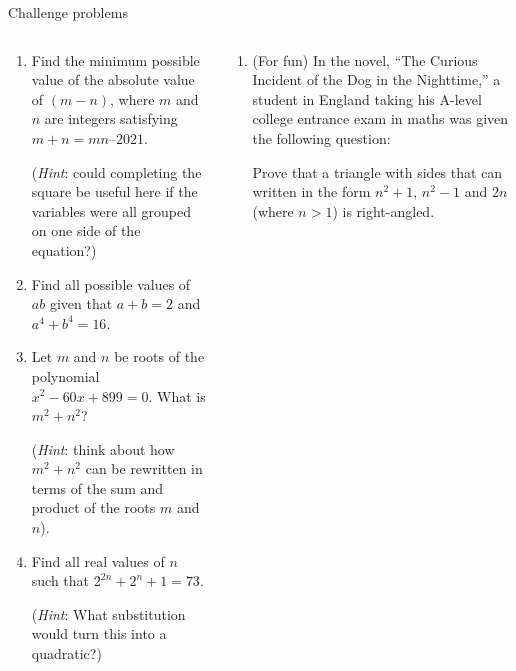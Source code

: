 \documentclass[9pt,aspectratio=169]{beamer}
\begin{document}
\begin{frame}{Challenge problems}
  \begin{columns}[T]
    \begin{column}{0.5\textwidth}
      \begin{enumerate}
        \item Find the minimum possible value of the absolute value of $(m - n)$, where $m$ and $n$ are integers satisfying $m + n = mn – 2021$. 
        
        (\emph{Hint}: could completing the square be useful here if the variables were all grouped on one side of the equation?)
        \item Find all possible values of $ab$ given that $a+ b = 2$ and $a^4 + b^4 = 16$. 
        \item Let $m$ and $n$ be roots of the polynomial $x^2 − 60x + 899 = 0.$  What is $m^2 + n^2$? 
        
        (\emph{Hint}: think about how $m^2 + n^2$ can be rewritten in terms of the sum and product of the roots $m$ and $n$).
        \item Find all real values of $n$ such that $2^{2n} + 2^n + 1 = 73$.  
        
        (\emph{Hint}:  What substitution would turn this into a quadratic?)
        \seti
      \end{enumerate}
    \end{column}
    \begin{column}{0.5\textwidth}
      \begin{enumerate}
        \conti
        \item (For fun) In the novel, “The Curious Incident of the Dog in the Nighttime,” a student in England taking his A-level college entrance exam in maths was given the following question: 
        
        Prove that a triangle with sides that can written in the form $n^2 +1$, $n^2 -1$ and $2n$ (where $n > 1$) is right-angled.  
      \end{enumerate}
    \end{column}
  \end{columns}
\end{frame}

\end{document}
